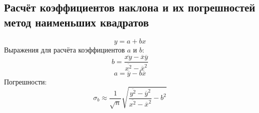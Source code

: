 \documentclass[12pt]{article}
\begin{document}
\subsection{Расчёт коэффициентов наклона и их погрешностей метод наименьших квадратов}\label{sec:app_6}
$$y = a + bx$$
Выражения для расчёта коэффициентов $a$ и $b$:
$$b = \frac{\overline{xy} - \overline{x}\overline{y}}{\overline{x^2} - \overline{x}^2}$$
$$a = \overline{y} - b\overline{x}$$
Погрешности:
$$\sigma_b \approx \frac{1}{\sqrt{n}}\sqrt{\frac{\overline{y^2} - \overline{y}^2}{\overline{x^2} - \overline{x}^2} - b^2}$$
\end{document}
